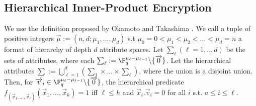 \documentclass[11pt,hidelinks]{article}
\begin{document}
\begin{appendix}
\section{Hierarchical Inner-Product Encryption}
We use the definition proposed by Okamoto and Takashima \cite{AC:OkaTak09}. We call a tuple of positive integers $\overrightarrow{\mu}:=(n,d;\mu_{1},...,\mu_{d})$ s.t $\mu_{0}=0<\mu_{1}<\mu_{2}<...<\mu_{d}=n$ a format of hierarchy of depth $d$ attribute spaces. Let $\sum_{\ell}(\ell=1,..,d)$ be the sets of attributes, where each $\sum_{\ell}:= \F^{\mu_{\ell}-\mu_{\ell-1}}_{q} \backslash \{\overrightarrow{0}\}$. Let the hierarchical attributes $\sum:=\bigcup^{d}_{\ell=1}(\sum_{1} \times ...\times \sum_{\ell})$, where the union is a disjoint union. Then, for $\overrightarrow{v}_{i} \in \F^{\mu_{\ell}-\mu_{\ell-1}}_{q} \backslash \{\overrightarrow{0}\}$, the hierarchical predicate $f_{(\overrightarrow{v}_{1},...,\overrightarrow{v}_{\ell})}(\overrightarrow{x}_{1},...,\overrightarrow{x}_{h})=1$ iff $\ell\leq h$ and $\overrightarrow{x}_{i}.\overrightarrow{v}_{i}=0$ for all $i$ s.t. $a\leq i \leq \ell$.\


\end{appendix}
\end{document}
